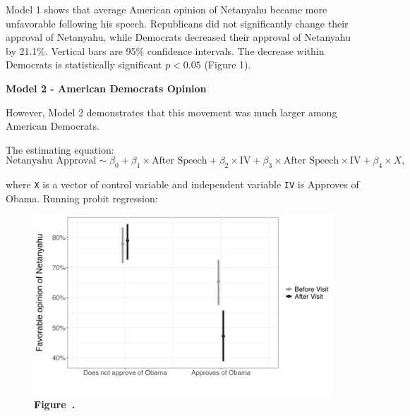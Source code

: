 \documentclass[12pt,letterpaper]{article}
\begin{document}
Model 1 shows that average American opinion of Netanyahu became more unfavorable following his speech. Republicans did not significantly change their approval of Netanyahu, while Democrats decreased their approval of Netanyahu by 21.1\%. Vertical bars are 95\% confidence intervals. The decrease within Democrats is statistically significant \(p < 0.05\) (Figure 1).
	
\begin{center}
		\noindent \textbf{Model 2 - American Democrats Opinion}
\end{center}

However, Model 2 demonstrates that this movement was much larger among American Democrats.
	
		\vspace{0.5cm}
	\noindent The estimating equation:
	\begin{equation}
		\text{Netanyahu Approval} \sim \beta_{0} + \beta_{1} \times \text{After Speech} + \beta_{2} \times \text{IV} + \beta_{3} \times \text{After Speech} \times \text{IV} + \beta_{4} \times X,
	\end{equation}
	
	\noindent where \texttt{X} is a vector of control variable and independent variable \texttt{IV} is Approves of Obama. 
			\vspace{0.5cm}
	\noindent  Running probit regression: 
	 
	
	\begin{figure}[H]
		\centering
		\includegraphics[width=1.0\textwidth]{figures_rep/Figure2.png}
		\label{fig:your_figure_label} 
		\textbf{Figure~\thefigure.}
		\label{fig:figure2}
	\end{figure}
	
\end{document}
